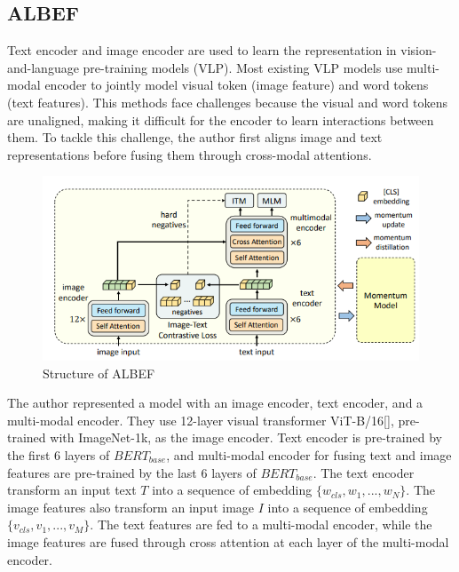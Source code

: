 
\subsection{ALBEF}
Text encoder and image encoder are used to learn the representation in vision-and-language pre-training models (VLP). Most existing VLP models use multi-modal encoder to jointly model visual token (image feature) and word tokens (text features). This methods face challenges because the visual and word tokens are unaligned, making it difficult for the encoder to learn interactions between them. 
To tackle this challenge, the author first aligns image and text representations before fusing them through cross-modal attentions. 

\begin{figure}[htbp]
    \begin{center}
        \includegraphics[width=\linewidth]{img/albef_model_structure.png}
        \caption{Structure of ALBEF}
        \label{fig:albef}
    \end{center}
\end{figure}

The author represented a model with an image encoder, text encoder, and a multi-modal encoder. They use 12-layer visual transformer ViT-B/16[\cite{dosovitskiy2021image}], pre-trained with ImageNet-1k, as the image encoder. 
Text encoder is pre-trained by the first 6 layers of $BERT_{base}$, and multi-modal encoder for fusing text and image features are pre-trained by the last 6 layers of $BERT_{base}$. The text encoder transform an input text $T$ into a sequence of embedding $\{w_{cls}, w_1, ..., w_N\}$. The image features also transform an input image $I$ into a sequence of embedding $\{v_{cls}, v_1, ..., v_M\}$. The text features are fed to a multi-modal encoder, while the image features are fused through cross attention at each layer of the multi-modal encoder.

